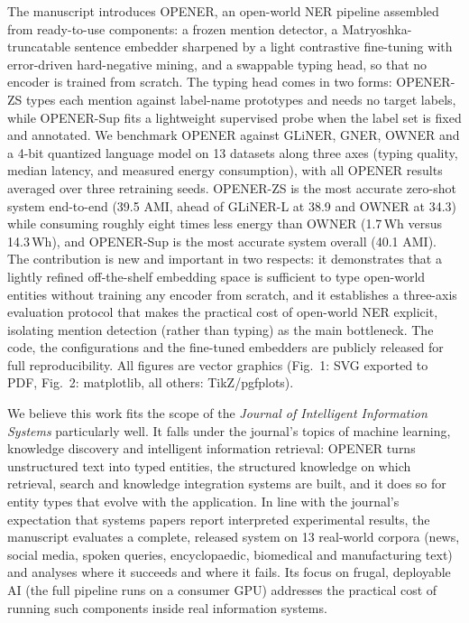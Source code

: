 \documentclass[10pt]{article}
\begin{document}
The manuscript introduces OPENER, an open-world NER pipeline assembled from ready-to-use components: a frozen mention detector, a Matryoshka-truncatable sentence embedder sharpened by a light contrastive fine-tuning with error-driven hard-negative mining, and a swappable typing head, so that no encoder is trained from scratch.
The typing head comes in two forms: OPENER-ZS types each mention against label-name prototypes and needs no target labels, while OPENER-Sup fits a lightweight supervised probe when the label set is fixed and annotated.
We benchmark OPENER against GLiNER, GNER, OWNER and a 4-bit quantized language model on 13 datasets along three axes (typing quality, median latency, and measured energy consumption), with all OPENER results averaged over three retraining seeds.
OPENER-ZS is the most accurate zero-shot system end-to-end (39.5 AMI, ahead of GLiNER-L at 38.9 and OWNER at 34.3) while consuming roughly eight times less energy than OWNER (1.7\,Wh versus 14.3\,Wh), and OPENER-Sup is the most accurate system overall (40.1 AMI).
The contribution is new and important in two respects: it demonstrates that a lightly refined off-the-shelf embedding space is sufficient to type open-world entities without training any encoder from scratch, and it establishes a three-axis evaluation protocol that makes the practical cost of open-world NER explicit, isolating mention detection (rather than typing) as the main bottleneck.
The code, the configurations and the fine-tuned embedders are publicly released for full reproducibility.
All figures are vector graphics (Fig.~1: SVG exported to PDF, Fig.~2: matplotlib, all others: TikZ/pgfplots).

We believe this work fits the scope of the \textit{Journal of Intelligent Information Systems} particularly well.
It falls under the journal's topics of machine learning, knowledge discovery and intelligent information retrieval: OPENER turns unstructured text into typed entities, the structured knowledge on which retrieval, search and knowledge integration systems are built, and it does so for entity types that evolve with the application.
In line with the journal's expectation that systems papers report interpreted experimental results, the manuscript evaluates a complete, released system on 13 real-world corpora (news, social media, spoken queries, encyclopaedic, biomedical and manufacturing text) and analyses where it succeeds and where it fails.
Its focus on frugal, deployable AI (the full pipeline runs on a consumer GPU) addresses the practical cost of running such components inside real information systems.
\end{document}
